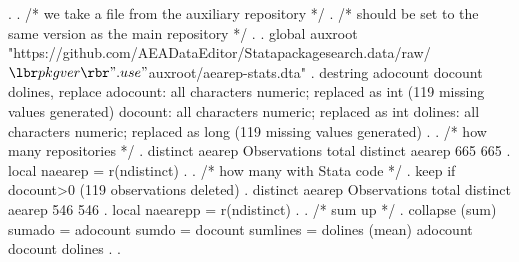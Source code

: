 . 
. /* we take a file from the auxiliary repository             */
. /* should be set to the same version as the main repository */
. 
. global auxroot "https://github.com/AEADataEditor/Statapackagesearch.data/raw/${\lbr}pkgver{\rbr}"
{\smallskip}
. use "$auxroot/aearep-stats.dta"
{\smallskip}
. destring adocount docount dolines, replace
adocount: all characters numeric; replaced as int
(119 missing values generated)
docount: all characters numeric; replaced as int
dolines: all characters numeric; replaced as long
(119 missing values generated)
{\smallskip}
. 
. /* how many repositories */
. distinct aearep
{\smallskip}
        {\VBAR}        Observations
        {\VBAR}      total   distinct
 aearep {\VBAR}        665        665
{\smallskip}
. local naearep = r(ndistinct)
{\smallskip}
. 
. /* how many with Stata code */
. keep if docount>0
(119 observations deleted)
{\smallskip}
. distinct aearep
{\smallskip}
        {\VBAR}        Observations
        {\VBAR}      total   distinct
 aearep {\VBAR}        546        546
{\smallskip}
. local naearepp = r(ndistinct)
{\smallskip}
. 
. /* sum up */
. collapse (sum) sumado = adocount sumdo = docount sumlines = dolines (mean) adocount docount dolines
{\smallskip}
. 
. 
